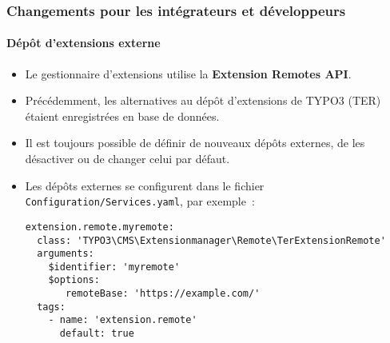 %

\begin{frame}[fragile]
	\frametitle{Changements pour les intégrateurs et développeurs}
	\framesubtitle{Dépôt d'extensions externe}


	\begin{itemize}
		\item Le gestionnaire d'extensions utilise la \textbf{Extension Remotes API}.
		\item Précédemment, les alternatives au dépôt d'extensions de TYPO3 (TER)
			étaient enregistrées en base de données.
		\item Il est toujours possible de définir de nouveaux dépôts externes,
			de les désactiver ou de changer celui par défaut.
		\item Les dépôts externes se configurent dans le fichier
			\small\texttt{Configuration/Services.yaml}, par exemple~:
\begin{lstlisting}
extension.remote.myremote:
  class: 'TYPO3\CMS\Extensionmanager\Remote\TerExtensionRemote'
  arguments:
    $identifier: 'myremote'
    $options:
       remoteBase: 'https://example.com/'
  tags:
    - name: 'extension.remote'
      default: true
\end{lstlisting}

	\end{itemize}

\end{frame}

